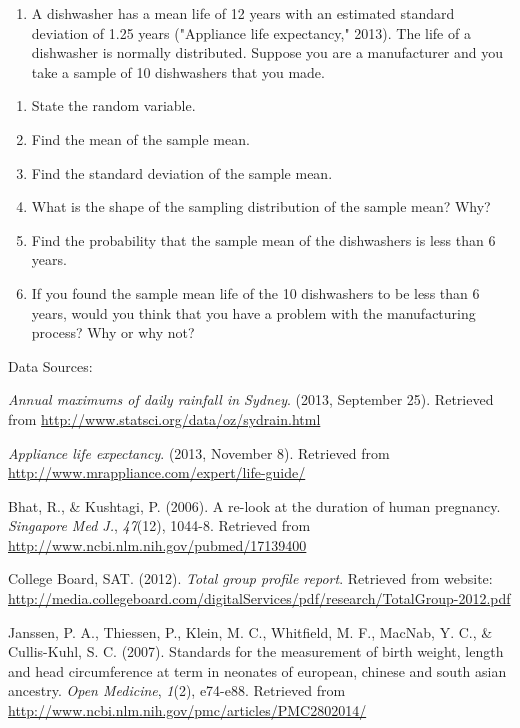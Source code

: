 \documentclass[
]{book}
\providecommand{\tightlist}{%
  \setlength{\itemsep}{0pt}\setlength{\parskip}{0pt}}
\begin{document}
\begin{enumerate}
\def\labelenumi{\arabic{enumi}.}
\setcounter{enumi}{7}
\tightlist
\item
  A dishwasher has a mean life of 12 years with an estimated standard deviation of 1.25 years ("Appliance life expectancy," 2013). The life of a dishwasher is normally distributed. Suppose you are a manufacturer and you take a sample of 10 dishwashers that you made.
\end{enumerate}

\begin{enumerate}
\def\labelenumi{\alph{enumi}.}
\tightlist
\item
  State the random variable.
\item
  Find the mean of the sample mean.
\item
  Find the standard deviation of the sample mean.
\item
  What is the shape of the sampling distribution of the sample mean? Why?
\item
  Find the probability that the sample mean of the dishwashers is less than 6 years.
\item
  If you found the sample mean life of the 10 dishwashers to be less than 6 years, would you think that you have a problem with the manufacturing process? Why or why not?
\end{enumerate}

Data Sources:

\emph{Annual maximums of daily rainfall in Sydney}. (2013, September 25).
Retrieved from \url{http://www.statsci.org/data/oz/sydrain.html}

\emph{Appliance life expectancy}. (2013, November 8). Retrieved from
\url{http://www.mrappliance.com/expert/life-guide/}

Bhat, R., \& Kushtagi, P. (2006). A re-look at the duration of human
pregnancy. \emph{Singapore Med J.}, \emph{47}(12), 1044-8. Retrieved from
\url{http://www.ncbi.nlm.nih.gov/pubmed/17139400}

College Board, SAT. (2012). \emph{Total group profile report}. Retrieved from
website:
\url{http://media.collegeboard.com/digitalServices/pdf/research/TotalGroup-2012.pdf}

Janssen, P. A., Thiessen, P., Klein, M. C., Whitfield, M. F., MacNab, Y.
C., \& Cullis-Kuhl, S. C. (2007). Standards for the measurement of birth
weight, length and head circumference at term in neonates of european,
chinese and south asian ancestry. \emph{Open Medicine}, \emph{1}(2), e74-e88.
Retrieved from \url{http://www.ncbi.nlm.nih.gov/pmc/articles/PMC2802014/}
\end{document}
